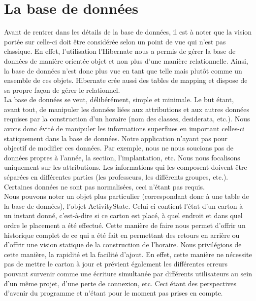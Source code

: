 \chapter{La base de données}

Avant de rentrer dans les détails de la base de données, il est à noter que la vision portée sur celle-ci doit être considérée selon un point de vue qui n'est pas classique. En effet, l'utilisation l'Hibernate nous a permis de gérer la base de données de manière orientée objet et non plus d'une manière relationnelle. Ainsi, la base de données n'est donc plus vue en tant que telle mais plutôt comme un ensemble de ces objets. Hibernate crée aussi des tables de mapping et dispose de sa propre façon de gérer le relationnel.\\
\newline
\indent
La base de données se veut, délibérément, simple et minimale. Le but étant, avant tout, de manipuler les données liées aux attributions et aux autres données requises par la construction d'un horaire (nom des classes, desiderata, etc.). Nous avons donc évité de manipuler les informations superflues en important celles-ci statiquement dans la base de données. Notre application n'ayant pas pour objectif de modifier ces données.
\newline
\indent
Par exemple, nous ne nous soucions pas de données propres à l'année, la section, l'implantation, etc. Nous nous focalisons uniquement sur les attributions. Les informations qui les composent doivent être séparées en différentes parties (les professeurs, les différents groupes, etc.). Certaines données ne sont pas normalisées, ceci n'étant pas requis.\\
\newline
\indent
Nous pouvons noter un objet plus particulier (correspondant donc à une table de la base de données), l'objet ActivityState. Celui-ci contient l'état d'un carton à un instant donné, 
c'est-à-dire si ce carton est placé, à quel endroit et dans quel ordre le placement a été effectué.  Cette manière de faire nous permet d'offrir un historique complet de ce qui a été fait en permettant des retours en arrière ou d'offrir une vision statique de la construction de l'horaire. 
\newline
\indent
Nous privilégions de cette manière,  la rapidité et la facilité d'ajout. En effet, cette manière ne nécessite pas de mettre le carton à jour et prévient également les différentes erreurs pouvant survenir comme une écriture simultanée par différents utilisateurs au sein d'un même projet, d'une perte de connexion, etc. Ceci étant des perspectives d'avenir du programme et n'étant pour le moment pas prises en compte.\\
